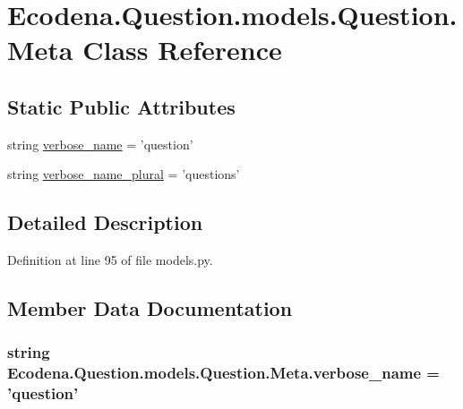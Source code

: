 \hypertarget{class_ecodena_1_1_question_1_1models_1_1_question_1_1_meta}{
\section{Ecodena.Question.models.Question.Meta Class Reference}
\label{d6/da7/class_ecodena_1_1_question_1_1models_1_1_question_1_1_meta}
}
\subsection*{Static Public Attributes}
\begin{DoxyCompactItemize}
\item 
string \hyperlink{class_ecodena_1_1_question_1_1models_1_1_question_1_1_meta_a1079a83cc552335694f5bc135284b7fd}{verbose\_\-name} = 'question'
\item 
string \hyperlink{class_ecodena_1_1_question_1_1models_1_1_question_1_1_meta_aa9d8ba6465bbcd410a41f58cb33daaa8}{verbose\_\-name\_\-plural} = 'questions'
\end{DoxyCompactItemize}


\subsection{Detailed Description}


Definition at line 95 of file models.py.



\subsection{Member Data Documentation}
\hypertarget{class_ecodena_1_1_question_1_1models_1_1_question_1_1_meta_a1079a83cc552335694f5bc135284b7fd}{
\subsubsection[{verbose\_\-name}]{\setlength{\rightskip}{0pt plus 5cm}string {\bf Ecodena.Question.models.Question.Meta.verbose\_\-name} = 'question'}}
\label{d6/da7/class_ecodena_1_1_question_1_1models_1_1_question_1_1_meta_a1079a83cc552335694f5bc135284b7fd}


